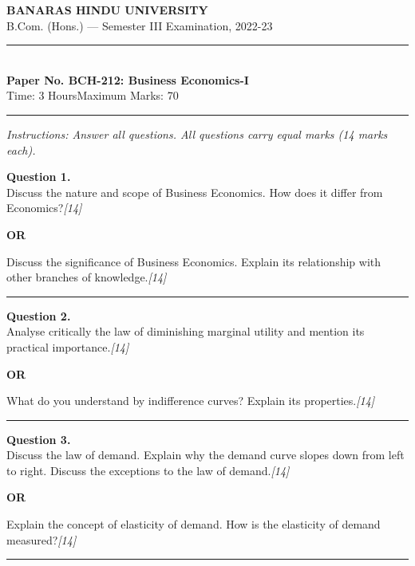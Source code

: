 \documentclass[11pt,a4paper]{article}
\newcommand{\pts}[1]{\hfill   \textit{[#1]}}
\begin{document}
\begin{center}
  {\large\bfseries BANARAS HINDU UNIVERSITY}\\[2pt]
  {\normalsize B.Com. (Hons.) --- Semester III Examination, 2022-23}\\[6pt]
  \rule{0.8\linewidth}{0.5pt}\\[6pt]
  {\large\bfseries Paper No. BCH-212: Business Economics-I}\\[4pt]
  {\normalsize Time: 3 Hours\hfill Maximum Marks: 70}
\end{center}

\rule{\linewidth}{0.4pt}

\smallskip



\noindent   \textit{Instructions: Answer all questions. All questions carry equal marks (14 marks each).}

\bigskip




\noindent   \textbf{Question 1.} \\
Discuss the nature and scope of Business Economics. How does it differ from Economics?\pts{14}

\centerline{   \textbf{OR}}

Discuss the significance of Business Economics. Explain its relationship with other branches of knowledge.\pts{14}

\medskip\rule{\linewidth}{0.2pt}




\noindent   \textbf{Question 2.} \\
Analyse critically the law of diminishing marginal utility and mention its practical importance.\pts{14}

\centerline{   \textbf{OR}}

What do you understand by indifference curves? Explain its properties.\pts{14}

\medskip\rule{\linewidth}{0.2pt}




\noindent   \textbf{Question 3.} \\
Discuss the law of demand. Explain why the demand curve slopes down from left to right. Discuss the exceptions to the law of demand.\pts{14}

\centerline{   \textbf{OR}}

Explain the concept of elasticity of demand. How is the elasticity of demand measured?\pts{14}

\medskip\rule{\linewidth}{0.2pt}
\end{document}

